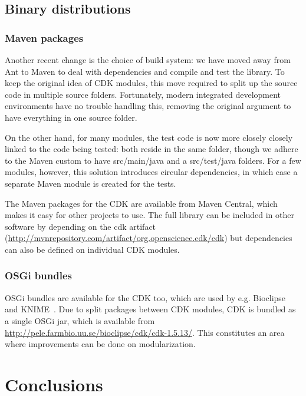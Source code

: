 \documentclass[10pt]{bmcart}
\begin{document}
\subsection*{Binary distributions}

\subsubsection*{Maven packages}

Another recent change is the choice of build system: we have moved away from
Ant to Maven to deal with dependencies and compile and test the library.
To keep the original idea of CDK modules, this move required to split up the
source code in multiple source folders. Fortunately, modern integrated
development environments have no trouble handling this, removing the original
argument to have everything in one source folder.

On the other hand, for many modules, the test code is now more closely closely
linked to the code being tested: both reside in the same folder, though we
adhere to the Maven custom to have src/main/java and a src/test/java folders.
For a few modules, however, this solution introduces circular dependencies, in
which case a separate Maven module is created for the tests.

The Maven packages for the CDK are available from Maven Central, which makes it
easy for other projects to use. The full library can be included in other
software by depending on the cdk artifact (\url{http://mvnrepository.com/artifact/org.openscience.cdk/cdk})
but dependencies can also be defined on individual CDK modules.

\subsubsection*{OSGi bundles}

OSGi bundles are available for the CDK too, which are used by e.g. Bioclipse~\cite{spjuth2007bioclipse,spjuth2009bioclipse} and KNIME~\cite{Beisken2013}. Due to split packages between CDK modules, CDK is bundled as a single OSGi jar, which is available from \url{http://pele.farmbio.uu.se/bioclipse/cdk/cdk-1.5.13/}. This constitutes an area where improvements can be done on modularization.



\section*{Conclusions}
\end{document}
